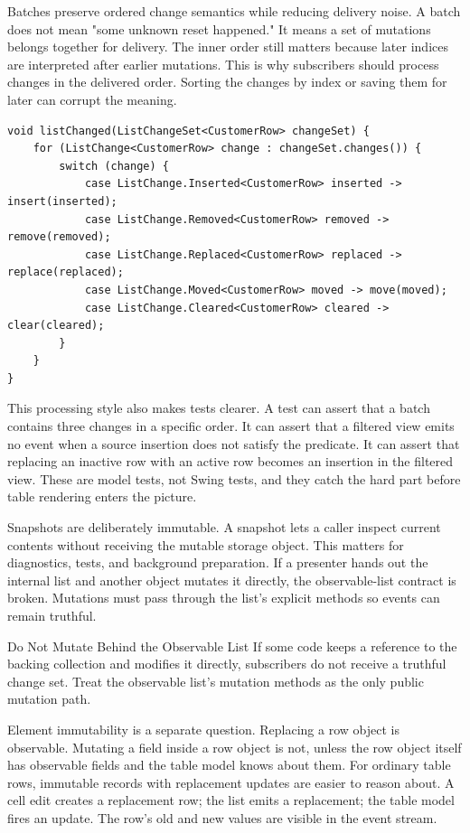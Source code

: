 Batches preserve ordered change semantics while reducing delivery noise. A batch
does not mean "some unknown reset happened." It means a set of mutations belongs
together for delivery. The inner order still matters because later indices are
interpreted after earlier mutations. This is why subscribers should process
changes in the delivered order. Sorting the changes by index or saving them for
later can corrupt the meaning.

\begin{lstlisting}[caption={Process a change set in order.}]
void listChanged(ListChangeSet<CustomerRow> changeSet) {
    for (ListChange<CustomerRow> change : changeSet.changes()) {
        switch (change) {
            case ListChange.Inserted<CustomerRow> inserted -> insert(inserted);
            case ListChange.Removed<CustomerRow> removed -> remove(removed);
            case ListChange.Replaced<CustomerRow> replaced -> replace(replaced);
            case ListChange.Moved<CustomerRow> moved -> move(moved);
            case ListChange.Cleared<CustomerRow> cleared -> clear(cleared);
        }
    }
}
\end{lstlisting}

This processing style also makes tests clearer. A test can assert that a batch
contains three changes in a specific order. It can assert that a filtered view
emits no event when a source insertion does not satisfy the predicate. It can
assert that replacing an inactive row with an active row becomes an insertion in
the filtered view. These are model tests, not Swing tests, and they catch the
hard part before table rendering enters the picture.

Snapshots are deliberately immutable. A snapshot lets a caller inspect current
contents without receiving the mutable storage object. This matters for
diagnostics, tests, and background preparation. If a presenter hands out the
internal list and another object mutates it directly, the observable-list
contract is broken. Mutations must pass through the list's explicit methods so
events can remain truthful.

\begin{pitfallbox}{Do Not Mutate Behind the Observable List}
If some code keeps a reference to the backing collection and modifies it
directly, subscribers do not receive a truthful change set. Treat the observable
list's mutation methods as the only public mutation path.
\end{pitfallbox}

Element immutability is a separate question. Replacing a row object is
observable. Mutating a field inside a row object is not, unless the row object
itself has observable fields and the table model knows about them. For ordinary
table rows, immutable records with replacement updates are easier to reason
about. A cell edit creates a replacement row; the list emits a replacement; the
table model fires an update. The row's old and new values are visible in the
event stream.

